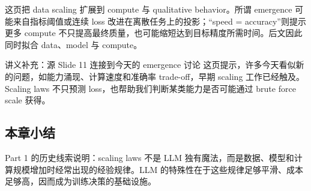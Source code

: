 这页把 data scaling 扩展到 compute 与 qualitative behavior。所谓 emergence 可能来自指标阈值或连续 loss 改进在离散任务上的投影；“speed = accuracy”则提示更多 compute 不只提高最终质量，也可能缩短达到目标精度所需时间。后文因此同时拟合 data、model 与 compute。

\begin{knowledgebox}{讲义补充：源 Slide 11 连接到今天的 emergence 讨论}
这页提示，许多今天看似新的问题，如能力涌现、计算速度和准确率 trade-off，早期 scaling 工作已经触及。Scaling laws 不只预测 loss，也帮助我们判断某类能力是否可能通过 brute force scale 获得。
\end{knowledgebox}

\subsection{本章小结}

Part 1 的历史线索说明：scaling laws 不是 LLM 独有魔法，而是数据、模型和计算规模增加时经常出现的经验规律。LLM 的特殊性在于这些规律足够平滑、成本足够高，因而成为训练决策的基础设施。

